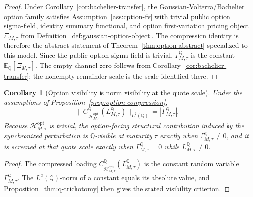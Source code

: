 \documentclass[11pt,a4paper]{amsart}
\theoremstyle{plain}
\newtheorem{corollary}[theorem]{Corollary}
\theoremstyle{definition}
\theoremstyle{remark}
\newcommand{\QQ}{\mathbb{Q}}
\newcommand{\EE}{\mathbb{E}}
\newcommand{\cH}{\mathcal{H}}
\begin{document}
\begin{proof}
Under Corollary~\ref{cor:bachelier-transfer}, the Gaussian-Volterra/Bachelier option family
satisfies Assumption~\ref{ass:option-fv} with trivial public option sigma-field,
identity summary functional, and option first-variation pricing object \(\Xi_{M,\tau}\) from
Definition~\ref{def:gaussian-option-object}.  The compression identity is therefore the abstract
statement of Theorem~\ref{thm:option-abstract} specialized to this model.  Since the public option
sigma-field is trivial, \(\Gamma_{M,\tau}^\QQ\) is the constant \(\EE_\QQ[\Xi_{M,\tau}]\).  The
empty-channel zero follows from Corollary~\ref{cor:bachelier-transfer}; the nonempty remainder
scale is the scale identified there.
\end{proof}

\begin{corollary}[Option visibility is norm visibility at the quote scale]\label{cor:option-norm}
Under the assumptions of Proposition~\ref{prop:option-compression},
\[
        \|C_{\cH_{M,\tau}^{\mathrm{opt}}}^{\QQ}(L_{M,\tau}^\QQ)\|_{L^2(\QQ)}
        =
        |\Gamma_{M,\tau}^\QQ|.
\]
Because \(\cH_{M,\tau}^{\mathrm{opt}}\) is trivial, the option-facing structural contribution
induced by the synchronized perturbation is \(\QQ\)-visible at maturity \(\tau\) exactly when
\(\Gamma_{M,\tau}^\QQ\neq0\), and it is screened at that quote scale exactly when
\(\Gamma_{M,\tau}^\QQ=0\) while
\(L_{M,\tau}^\QQ\neq0\).
\end{corollary}

\begin{proof}
The compressed loading \(C_{\cH_{M,\tau}^{\mathrm{opt}}}^{\QQ}(L_{M,\tau}^\QQ)\) is the constant
random variable \(\Gamma_{M,\tau}^\QQ\).  The \(L^2(\QQ)\)-norm of a constant equals its absolute
value, and Proposition~\ref{thm:q-trichotomy} then gives the stated visibility criterion.
\end{proof}
\end{document}
